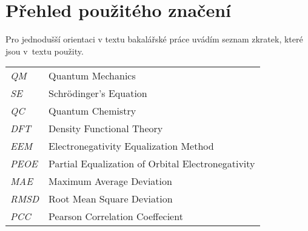 \chapter*{Přehled použitého značení}

Pro jednodušší orientaci v textu bakalářské práce uvádím seznam zkratek, které jsou v~textu použity.
\begin{flushleft}
\begin{longtable}[l]{ll} %
  \textit{QM}                 & Quantum Mechanics
  \\[1mm]
  \textit{SE}                 & Schrödinger's Equation
  \\[1mm]
  \textit{QC }                & Quantum Chemistry
  \\[1mm]
  \textit{DFT}                & Density Functional Theory
  \\[1mm]
  \textit{EEM}                 & Electronegativity Equalization Method
  \\[1mm]
  \textit{PEOE}                 & Partial Equalization of Orbital Electronegativity
  \\[1mm]
  \textit{MAE}                 & Maximum Average Deviation
  \\[1mm]
  \textit{RMSD}                 & Root Mean Square Deviation
  \\[1mm]
  \textit{PCC}                 & Pearson Correlation Coeffecient
  \\[1mm]

\end{longtable}
\end{flushleft}
